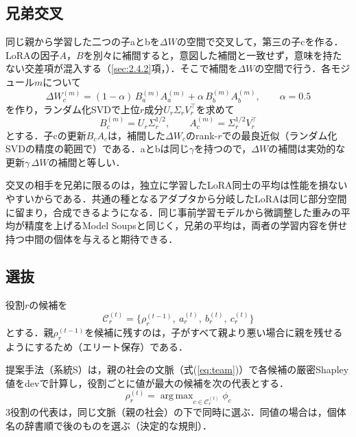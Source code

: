 \subsection{兄弟交叉}
\label{sec:3.5.4}

同じ親から学習した二つの子aとbを$\Delta W$の空間で交叉して，第三の子cを作る．LoRAの因子$A$，$B$を別々に補間すると，意図した補間と一致せず，意味を持たない交差項が混入する（\ref{sec:2.4.2}項，\cite{stoica2024knots}）．そこで補間を$\Delta W$の空間で行う．各モジュール$m$について
\begin{equation}
\Delta W_c^{(m)} = (1-\alpha)\, B_a^{(m)} A_a^{(m)} + \alpha\, B_b^{(m)} A_b^{(m)}, \qquad \alpha = 0.5
\label{eq:blend}
\end{equation}
を作り，ランダム化SVD\cite{halko2011finding}で上位$r$成分$U_r \Sigma_r V_r^\top$を求めて
\begin{equation}
B_c^{(m)} = U_r \Sigma_r^{1/2}, \qquad A_c^{(m)} = \Sigma_r^{1/2} V_r^\top
\label{eq:svd}
\end{equation}
とする．子cの更新$B_c A_c$は，補間した$\Delta W_c$のrank-$r$での最良近似（ランダム化SVDの精度の範囲で）である．aとbは同じ$\gamma$を持つので，$\Delta W$の補間は実効的な更新$\gamma\,\Delta W$の補間と等しい．

交叉の相手を兄弟に限るのは，独立に学習したLoRA同士の平均は性能を損ないやすいからである\cite{zhuang2025coto}．共通の種となるアダプタから分岐したLoRAは同じ部分空間に留まり，合成できるようになる\cite{salamanca2024seeded}．同じ事前学習モデルから微調整した重みの平均が精度を上げるModel Soups\cite{wortsman2022model}と同じく，兄弟の平均は，両者の学習内容を併せ持つ中間の個体を与えると期待できる．

\subsection{選抜}
\label{sec:3.5.5}

役割$r$の候補を
\begin{equation}
\mathcal{C}_r^{(t)} = \{\rho_r^{(t-1)},\ a_r^{(t)},\ b_r^{(t)},\ c_r^{(t)}\}
\label{eq:candidates}
\end{equation}
とする．親$\rho_r^{(t-1)}$を候補に残すのは，子がすべて親より悪い場合に親を残せるようにするため（エリート保存）である．

提案手法（系統S）は，親の社会の文脈（式(\ref{eq:team})）で各候補の厳密Shapley値をdevで計算し，役割ごとに値が最大の候補を次の代表とする．
\begin{equation}
\rho_r^{(t)} = \mathop{\mathrm{arg\,max}}_{c \in \mathcal{C}_r^{(t)}} \phi_c
\label{eq:selection}
\end{equation}
3役割の代表は，同じ文脈（親の社会）の下で同時に選ぶ．同値の場合は，個体名の辞書順で後のものを選ぶ（決定的な規則）．

